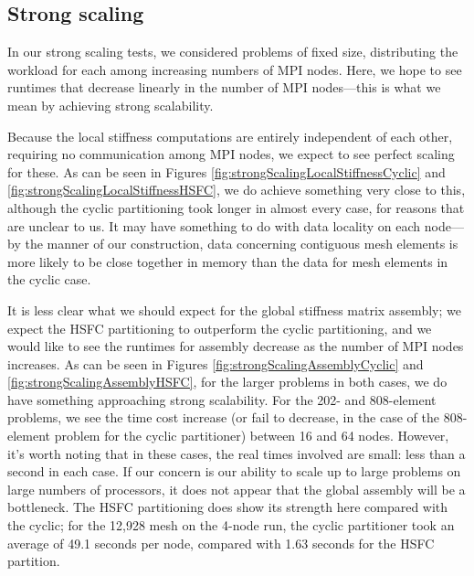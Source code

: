 \documentclass{article}
\begin{document}
\subsection{Strong scaling}\label{sec:strongScaling}
In our strong scaling tests, we considered problems of fixed size, distributing the workload for each among increasing numbers of MPI nodes.  Here, we hope to see runtimes that decrease linearly in the number of MPI nodes---this is what we mean by achieving strong scalability.

Because the local stiffness computations are entirely independent of each other, requiring no communication among MPI nodes, we expect to see perfect scaling for these.  As can be seen in Figures \ref{fig:strongScalingLocalStiffnessCyclic} and \ref{fig:strongScalingLocalStiffnessHSFC}, we do achieve something very close to this, although the cyclic partitioning took longer in almost every case, for reasons that are unclear to us.  It may have something to do with data locality on each node---by the manner of our construction, data concerning contiguous mesh elements is more likely to be close together in memory than the data for mesh elements in the cyclic case.

It is less clear what we should expect for the global stiffness matrix assembly; we expect the HSFC partitioning to outperform the cyclic partitioning, and we would like to see the runtimes for assembly decrease as the number of MPI nodes increases.  As can be seen in Figures \ref{fig:strongScalingAssemblyCyclic} and \ref{fig:strongScalingAssemblyHSFC}, for the larger problems in both cases, we do have something approaching strong scalability.  For the 202- and 808-element problems, we see the time cost increase (or fail to decrease, in the case of the 808-element problem for the cyclic partitioner) between 16 and 64 nodes.  However, it's worth noting that in these cases, the real times involved are small: less than a second in each case.  If our concern is our ability to scale up to large problems on large numbers of processors, it does not appear that the global assembly will be a bottleneck.  The HSFC partitioning does show its strength here compared with the cyclic; for the 12,928 mesh on the 4-node run, the cyclic partitioner took an average of 49.1 seconds per node, compared with 1.63 seconds for the HSFC partition.
\end{document}
